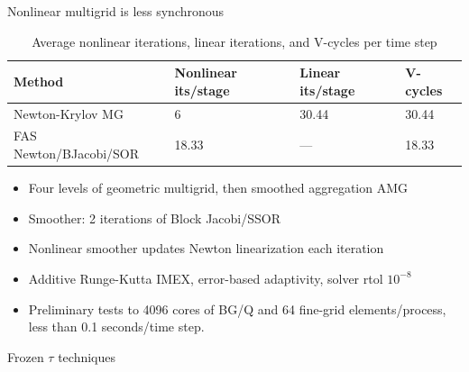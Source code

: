 \documentclass[final,t]{beamer}
\begin{document}
\begin{frame}{}
\begin{columns}
    \begin{column}{0.31\textwidth}
      \begin{block}{Nonlinear multigrid is less synchronous}
        \begin{table}
          \centering\caption{Average nonlinear iterations, linear iterations, and V-cycles per time step}\label{tab:iterations}
          \begin{tabular}{llll}
            \toprule
            Method & Nonlinear its/stage & Linear its/stage & V-cycles \\
            \midrule
            Newton-Krylov MG & 6 & 30.44 & 30.44 \\
            FAS Newton/BJacobi/SOR & 18.33 & --- & 18.33 \\
            \bottomrule
          \end{tabular}
        \end{table}
        \begin{itemize}
        \item Four levels of geometric multigrid, then smoothed aggregation AMG
        \item Smoother: 2 iterations of Block Jacobi/SSOR
        \item Nonlinear smoother updates Newton linearization each iteration
        \item Additive Runge-Kutta IMEX, error-based adaptivity, solver rtol $10^{-8}$
        \item Preliminary tests to 4096 cores of BG/Q and 64 fine-grid elements/process, less than 0.1 seconds/time step.
        \end{itemize}
      \end{block}
      \vspace{-2em}
      \begin{block}{Frozen $\tau$ techniques}
        \begin{figure}
          \centering
          \begin{subfigure}[b]{0.18\textwidth}

\end{subfigure}
\end{figure}
\end{block}
\end{column}
\end{columns}
\end{frame}
\end{document}
